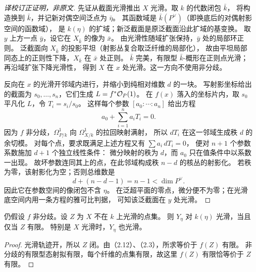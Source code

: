 \begin{proof}[译校订正证明，非原文]
先证从截面光滑推出 $X$ 光滑。取 $k$ 的代数闭包 $\bar k$，
将构造换到 $\bar k$，并记新对偶空间泛点为 $\bar\eta$。
其函数域是 $\bar k(P^\vee)$（即换底后的对偶射影空间的函数域），
是 $k(\eta)$ 的扩域；新泛截面是原泛截面沿此扩域的基变换。
取 $y$ 上方一点 $\bar y$，设它在 $X_{\bar k}$ 的像为 $\bar x$。
由光滑性随域扩张保持，$\bar y$ 处的局部环正则。
泛截面向 $X_{\bar k}$ 的投影平坦（射影丛复合取泛纤维的局部化），
故由平坦局部同态上的正则性下降，$X_{\bar k}$ 在 $\bar x$ 处正则。
$\bar k$ 完美，有限型 $\bar k$-概形在正则点光滑；再沿域扩张下降光滑性，
得到 $X$ 在 $x$ 处光滑。这一方向不使用非分歧。

反向在 $x$ 的光滑开邻域内进行，并缩小到纯相对维数 $d$ 的一块。
写射影坐标给出的截面为 $s_0,\ldots,s_n$，它们生成 $L=f^*\mathcal O_P(1)$。
在 $f(x)$ 落入的坐标片内，取 $s_0$ 平凡化 $L$，令 $T_i=s_i/s_0$。
这样每个参数 $[a_0:\cdots:a_n]$ 给出方程
\[
 a_0+\sum_{i=1}^n a_i T_i=0.
\]
因为 $f$ 非分歧，$\Omega^1_{P/k}$ 向 $\Omega^1_{X/k}$ 的拉回映射满射，
所以 $dT_i$ 在这一邻域生成秩 $d$ 的余切模。
对每个点，要求既满足上述方程又有 $\sum a_i\,dT_i=0$，
便对 $n+1$ 个参数系数施加 $d+1$ 个独立线性条件：
微分映射的秩为 $d$，而 $a_0$ 只在值条件中以系数一出现。
故坏参数连同其上的点，在此邻域构成秩 $n-d$ 的核丛的射影化。
若秩为零，该射影化为空；否则总维数是
\[
 d+(n-d-1)=n-1<\dim P^\vee .
\]
因此它在参数空间的像闭包不含 $\eta$。
在泛超平面的零点，微分便不为零；在光滑底空间内用一条方程的雅可比判据，
可知该泛截面在 $y$ 处光滑。
\end{proof}

仍假设 $f$ 非分歧。设 $Z$ 为 $X$ 不在 $k$ 上光滑的点集。
则 $Y_\eta$ 对 $k(\eta)$ 光滑，当且仅当 $Z$ 有限。
特别是 $X$ 光滑时，$Y_\eta$ 也光滑。
\begin{proof}
光滑轨迹开，所以 $Z$ 闭。由（2.12）、（2.3），所求等价于 $f(Z)$ 有限。
非分歧的有限型态射拟有限，每个纤维的点集有限，故这里 $f(Z)$ 有限恰等价于 $Z$ 有限。
\end{proof}

\endgroup
